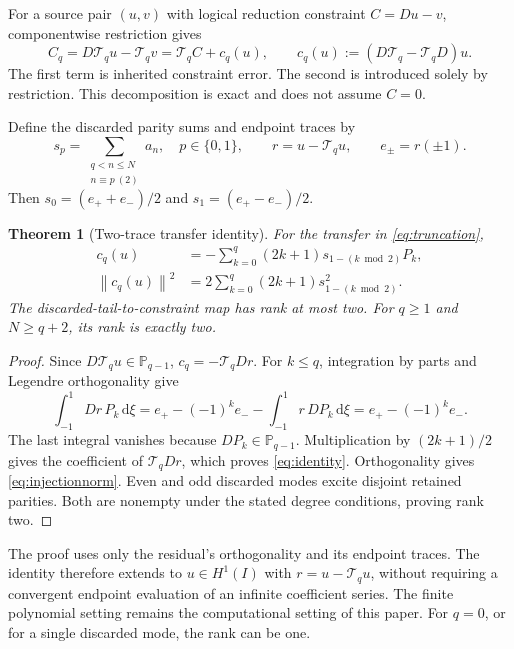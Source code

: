 \documentclass[11pt,a4paper]{article}
\newtheorem{theorem}{Theorem}
\theoremstyle{remark}\newtheorem{remark}[theorem]{Remark}
\newcommand{\norm}[1]{\left\lVert #1\right\rVert}
\newcommand{\dd}{\,\mathrm{d}}
\newcommand{\T}{\mathcal{T}}
\begin{document}
For a source pair \((u,v)\) with logical reduction constraint \(C=Du-v\),
componentwise restriction gives
\begin{equation}
 C_q=D\T_q u-\T_q v
     =\T_q C+c_q(u),\qquad
 c_q(u):=(D\T_q-\T_q D)u.
 \label{eq:inherited}
\end{equation}
The first term is inherited constraint error. The second is introduced solely
by restriction. This decomposition is exact and does not assume \(C=0\).

Define the discarded parity sums and endpoint traces by
\begin{equation}
 s_p=\sum_{\substack{q<n\le N\\n\equiv p\ (2)}}a_n,\quad p\in\{0,1\},
 \qquad r=u-\T_q u,\qquad e_\pm=r(\pm1).
 \label{eq:tail}
\end{equation}
Then \(s_0=(e_++e_-)/2\) and \(s_1=(e_+-e_-)/2\).

\begin{theorem}[Two-trace transfer identity]
\label{thm:identity}
For the transfer in \eqref{eq:truncation},
\begin{align}
 c_q(u)&=-\sum_{k=0}^{q}(2k+1)s_{1-(k\bmod2)}P_k,
 \label{eq:identity}\\
 \norm{c_q(u)}^2
 &=2\sum_{k=0}^{q}(2k+1)s_{1-(k\bmod2)}^2.
 \label{eq:injectionnorm}
\end{align}
The discarded-tail-to-constraint map has rank at most two. For \(q\ge1\)
and \(N\ge q+2\), its rank is exactly two.
\end{theorem}
\begin{proof}
Since \(D\T_q u\in\mathbb P_{q-1}\),
\(c_q=-\T_q Dr\). For \(k\le q\), integration by parts and Legendre
orthogonality give
\begin{equation}
 \int_{-1}^{1}Dr\,P_k\dd\xi
 =e_+-(-1)^k e_- -\int_{-1}^{1}r\,DP_k\dd\xi
 =e_+-(-1)^k e_-.
\end{equation}
The last integral vanishes because \(DP_k\in\mathbb P_{q-1}\).
Multiplication by \((2k+1)/2\) gives the coefficient of \(\T_q Dr\),
which proves \eqref{eq:identity}. Orthogonality gives
\eqref{eq:injectionnorm}. Even and odd discarded modes excite disjoint retained
parities. Both are nonempty under the stated degree conditions, proving rank two.
\end{proof}

The proof uses only the residual's orthogonality and its endpoint traces. The
identity therefore extends to \(u\in H^1(I)\) with \(r=u-\T_q u\), without
requiring a convergent endpoint evaluation of an infinite coefficient series.
The finite polynomial setting remains the computational setting of this paper.
For \(q=0\), or for a single discarded mode, the rank can be one.
\end{document}
